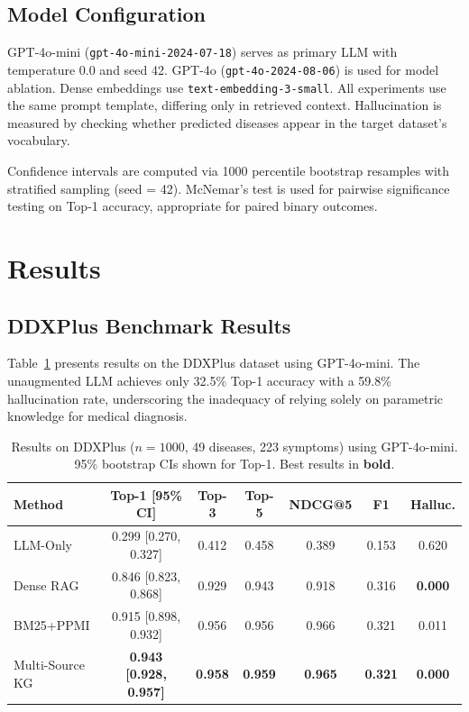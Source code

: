 \documentclass[preprint,12pt]{elsarticle}
\begin{document}
\subsection{Model Configuration}

GPT-4o-mini (\texttt{gpt-4o-mini-2024-07-18}) serves as primary LLM with temperature 0.0 and seed 42. GPT-4o (\texttt{gpt-4o-2024-08-06}) is used for model ablation. Dense embeddings use \texttt{text-embedding-3-small}. All experiments use the same prompt template, differing only in retrieved context. Hallucination is measured by checking whether predicted diseases appear in the target dataset's vocabulary.

Confidence intervals are computed via 1000 percentile bootstrap resamples with stratified sampling (seed = 42). McNemar's test is used for pairwise significance testing on Top-1 accuracy, appropriate for paired binary outcomes.

\section{Results}
\label{sec:results}

\subsection{DDXPlus Benchmark Results}

Table~\ref{tab:ddxplus} presents results on the DDXPlus dataset using GPT-4o-mini. The unaugmented LLM achieves only 32.5\% Top-1 accuracy with a 59.8\% hallucination rate, underscoring the inadequacy of relying solely on parametric knowledge for medical diagnosis.

\begin{table}[t]
\centering
\caption{Results on DDXPlus ($n{=}1000$, 49 diseases, 223 symptoms) using GPT-4o-mini. 95\% bootstrap CIs shown for Top-1. Best results in \textbf{bold}.}
\label{tab:ddxplus}
\begin{tabular}{lcccccc}
\toprule
\textbf{Method} & \textbf{Top-1 [95\% CI]} & \textbf{Top-3} & \textbf{Top-5} & \textbf{NDCG@5} & \textbf{F1} & \textbf{Halluc.} \\
\midrule
LLM-Only       & 0.299 {[}0.270, 0.327{]} & 0.412 & 0.458 & 0.389 & 0.153 & 0.620 \\
Dense RAG       & 0.846 {[}0.823, 0.868{]} & 0.929 & 0.943 & 0.918 & 0.316 & \textbf{0.000} \\
BM25+PPMI       & 0.915 {[}0.898, 0.932{]} & 0.956 & 0.956 & 0.966 & 0.321 & 0.011 \\
Multi-Source KG & \textbf{0.943 {[}0.928, 0.957{]}} & \textbf{0.958} & \textbf{0.959} & \textbf{0.965} & \textbf{0.321} & \textbf{0.000} \\
\bottomrule
\end{tabular}
\end{table}
\end{document}
